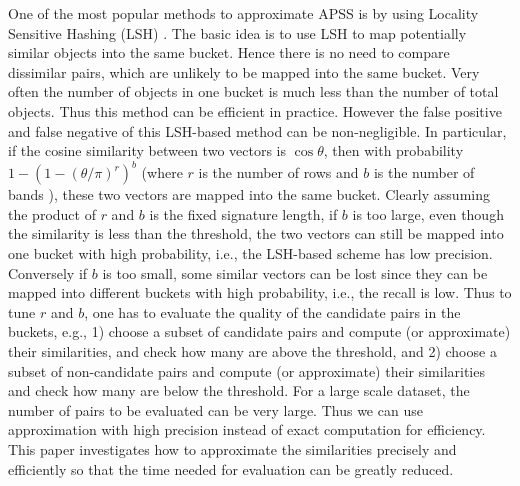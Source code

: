 \documentclass{article}
\begin{document}
{\color{black}
One of the most popular methods to approximate APSS is by using Locality Sensitive Hashing (LSH) \cite{LRU14}. The basic idea is to use LSH to map potentially similar objects into the same bucket. Hence there is no need to compare dissimilar pairs, which are unlikely to be mapped into the same bucket. Very often the number of objects in one bucket is much less than the number of total objects. Thus this method can be efficient in practice. However the false positive and false negative of this LSH-based method can be non-negligible. In particular, if the cosine similarity between two vectors is $\cos \theta$, then with probability $1-(1-(\theta/\pi)^r)^b$ (where $r$ is the number of rows and $b$ is the number of bands \cite{LRU14}), these two vectors are mapped into the same bucket. Clearly assuming the product of $r$ and $b$ is the fixed signature length, if $b$ is too large, even though the similarity is less than the threshold, the two vectors can still be mapped into one bucket with high probability, i.e., the LSH-based scheme has low precision. Conversely if $b$ is too small, some similar vectors can be lost since they can be mapped into different buckets with high probability, i.e., the recall is low. Thus to tune $r$ and $b$, one has to evaluate the quality of the candidate pairs in the buckets, e.g., 1) choose a subset of candidate pairs and compute (or approximate) their similarities, and check how many are above the threshold, and 2) choose a subset of non-candidate pairs and compute (or approximate) their similarities and check how many are below the threshold. For a large scale dataset, the number of pairs to be evaluated can be very large. Thus we can use approximation with high precision instead of exact computation for efficiency. This paper investigates how to approximate the similarities precisely and efficiently so that the time needed for evaluation can be greatly reduced.
}
\end{document}
